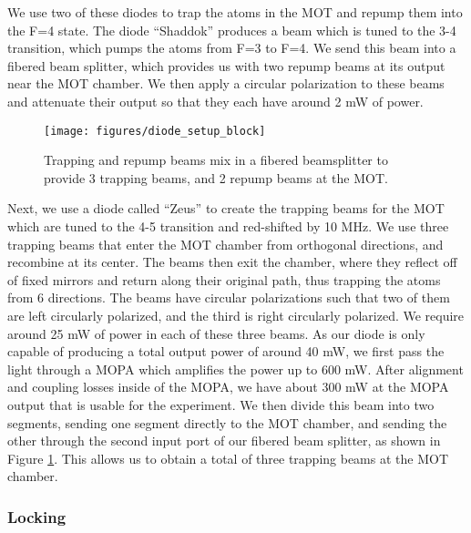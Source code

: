 We use two of these diodes to trap the atoms in the MOT and repump them into the
F=4 state.  The diode ``Shaddok'' produces a beam which
is tuned to the 3-4 transition, which pumps the atoms from F=3 to F=4.  We
send this beam into a fibered beam splitter, which provides us with two repump beams at its output near the MOT chamber.  We then apply a circular polarization to these beams and attenuate their output so that they each have around 2 mW of power.  


\begin{figure}[!ht] 
 \centering 
 \texttt{[image: figures/diode\_setup\_block]} 
 \caption[Block diagram for diode table]{Trapping and repump beams mix in a fibered beamsplitter to provide 3 trapping beams, and 2 repump beams at the MOT.} 
 \label{fig:diode_setup_block} 
\end{figure}


Next, we use a diode called ``Zeus'' to create the trapping beams for the MOT
which are tuned to the 4-5 transition and red-shifted by 10 MHz.  We use three
trapping beams that enter the MOT chamber from orthogonal directions, and
recombine at its center.  The beams then exit the chamber, where they reflect
off of fixed mirrors and return along their original path, thus trapping the
atoms from 6 directions.  The beams have circular polarizations such that two
of them are left circularly polarized, and the third is right circularly
polarized.  We require around 25 mW of power in each of these three beams.  As
our diode is only capable of producing a total output power of around 40 mW,
we first pass the light through a MOPA which amplifies the power up to 600 mW.
After alignment and coupling losses inside of the MOPA, we have about 300 mW
at the MOPA output that is usable for the experiment.  We then divide this
beam into two segments, sending one segment directly to the MOT chamber, and
sending the other through the second input port of our fibered beam splitter,
as shown in Figure \ref{fig:diode_setup_block}.  
This allows us to obtain a total of three trapping beams at the MOT chamber.





\subsubsection{Locking}
\label{locking} 

